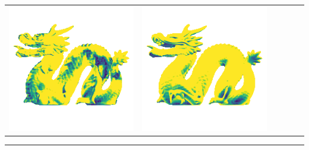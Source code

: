 \begin{tabularx}{\linewidth}{@{}Y@{}Y@{}Y@{}Y@{}Y@{}Y@{}}
\includegraphics[width=\linewidth]{semisynthetic/20160617_21_marrnet_err.png} &
\includegraphics[width=\linewidth]{semisynthetic/20160617_21_ef_err.png} \\
\end{tabularx}
\begin{center}\rule{0.5\linewidth}{\linethickness}\end{center}

